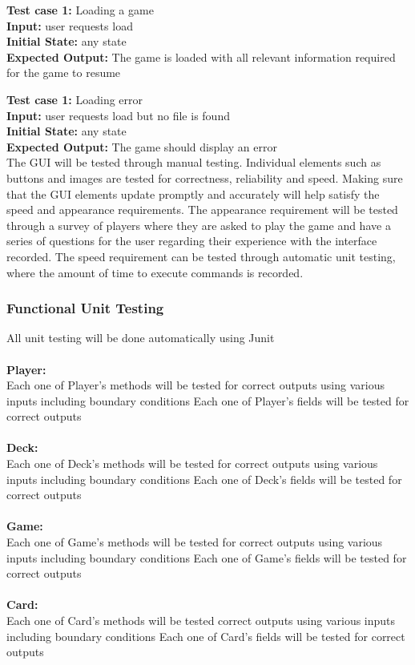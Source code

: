 \documentclass[12pt]{article}
\begin{document}
	\noindent \textbf{Test case 1:} Loading a game\\
	\textbf{Input:} user requests load\\
	\textbf{Initial State:} any state\\
	\textbf{Expected Output:} The game is loaded with all relevant information required for the game to resume
	
	\noindent \textbf{Test case 1:} Loading error\\
	\textbf{Input:} user requests load but no file is found\\
	\textbf{Initial State:} any state \\
	\textbf{Expected Output:} The game should display an error \\

The GUI will be tested through manual testing. Individual elements such as buttons and images are tested for correctness, reliability and speed. Making sure that the GUI elements update promptly and accurately will help satisfy the speed and appearance requirements. The appearance requirement will be tested through a survey of players where they are asked to play the game and have a series of questions for the user regarding their experience with the interface recorded. The speed requirement can be tested through automatic unit testing, where the amount of time to execute commands is recorded. 

	
	\subsubsection{Functional Unit Testing} 
    All unit testing will be done automatically using Junit\\
    \\
    \textbf{Player: } \\
    \indent \indent Each one of Player’s methods will be tested for correct outputs
using various inputs including boundary conditions
        Each one of Player’s fields will be tested for correct outputs\\
    \\
    \textbf{Deck:} \\
	\indent \indent Each one of Deck’s methods will be tested for correct outputs
using various inputs including boundary conditions
        Each one of Deck’s fields will be tested for correct outputs\\
    \\
    \textbf{Game:} \\
	\indent \indent Each one of Game’s methods will be tested for correct outputs
using various inputs including boundary conditions
        Each one of Game’s fields will be tested for correct outputs\\
	\\
    \textbf{Card:}\\
	\indent \indent Each one of Card’s methods will be tested correct outputs 
using various inputs including boundary conditions
        Each one of Card’s fields will be tested for correct outputs
\end{document}
